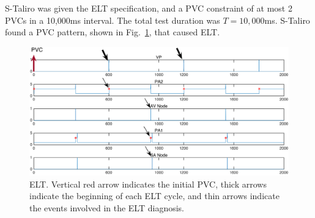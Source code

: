 S-Taliro was given the ELT specification, and a PVC constraint of at most 2 PVCs in a 10,000ms interval. 
The total test duration was $T= 10,000$ms.
S-Taliro found a PVC pattern, shown in Fig.~\ref{fig:bug13_kept1}, that caused ELT.
\begin{figure}[t]
\centering
\includegraphics[height=0.2\textheight,width=1\columnwidth]{figures/markedELT.pdf}
\caption{ELT. Vertical red arrow indicates the initial PVC, thick arrows indicate the beginning of each ELT cycle, and thin arrows indicate the events involved in the ELT diagnosis.}
\label{fig:bug13_kept1}
\end{figure}


